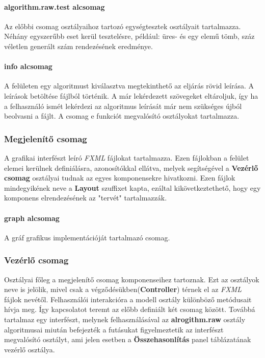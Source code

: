 \documentclass{elteikthesis}
\begin{document}
\paragraph{algorithm.raw.test alcsomag}
Az előbbi csomag osztályaihoz tartozó egységtesztek osztályait tartalmazza. Néhány egyszerűbb eset kerül tesztelésre, például: üres- és egy elemű tömb, száz véletlen generált szám rendezésének eredménye.
\paragraph{info alcsomag}
A felületen egy algoritmust kiválasztva megtekinthető az eljárás rövid leírása. A leírások betöltése fájlból történik. A már lekérdezett szövegeket eltároljuk, így ha a felhasználó ismét lekérdezi az algoritmus leírását már nem szükséges újból beolvasni a fájlt. A csomag e funkciót megvalósító osztályokat tartalmazza.

\subsubsection{Megjelenítő csomag}
A grafikai interfészt leíró \emph{FXML} fájlokat tartalmazza. Ezen fájlokban a felület elemei kerülnek definiálásra, azonosítókkal ellátva, melyek segítségével a \textbf{Vezérlő csomag} osztályai tudnak az egyes komponensekre hivatkozni. Ezen fájlok mindegyikének neve a \textbf{Layout} szuffixet kapta, ezáltal kikövetkeztethető, hogy egy komponens elrendezésének az "tervét" tartalmazzák.\par
\paragraph{graph alcsomag}
A gráf grafikus implementációját tartalmazó csomag.

\subsubsection{Vezérlő csomag}
Osztályai főleg a megjelenítő csomag komponenseihez tartoznak. Ezt az osztályok neve is jelölik, mivel csak a végződésükben(\textbf{Controller}) térnek el az \emph{FXML} fájlok nevétől. Felhasználói interakcióra a modell osztály különböző metódusait hívja meg. Így kapcsolatot teremt az előbb definiált két csomag között. Továbbá tartalmaz egy interfészt, melynek felhasználásával az \textbf{alrogithm.raw} osztály algoritmusai miután befejezték a futásukat figyelmeztetik az interfészt megvalósító osztályt, ami jelen esetben a \textbf{Összehasonlítás} panel táblázatának vezérlő osztálya.
\end{document}
